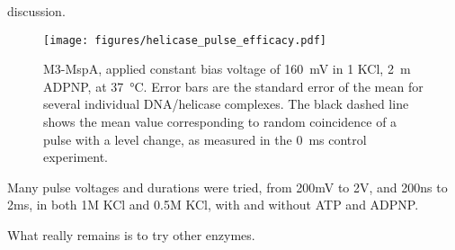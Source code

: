discussion.

\begin{figure}[h]
\begin{centering}
\texttt{[image: figures/helicase\_pulse\_efficacy.pdf]}
\caption[Quantifying efficacy of pulses]{M3-MspA, applied constant bias voltage of \SI{160}{\mV} in \SI{1}{\Molar} KCl, \SI{2}{\m\Molar} ADPNP, at \SI{37}{\celsius}.  Error bars are the standard error of the mean for several individual DNA/helicase complexes.  The black dashed line shows the mean value corresponding to random coincidence of a pulse with a level change, as measured in the \SI{0}{\ms} control experiment.}
\label{fig:helicase_pulse_efficacy}
\end{centering}
\end{figure}

Many pulse voltages and durations were tried, from 200mV to 2V, and 200ns to 2ms, in both 1M KCl and 0.5M KCl, with and without ATP and ADPNP.

What really remains is to try other enzymes.
